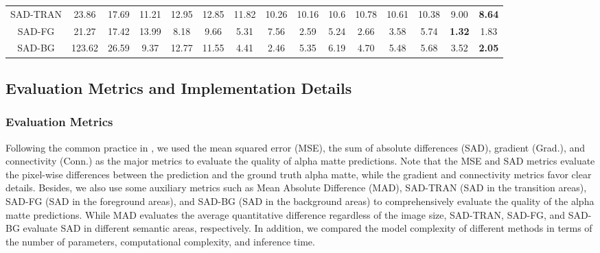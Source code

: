 \documentclass[twocolumn]{svjour3}
\begin{document}
\begin{table*}[htbp]
{\begin{tabular}{c|ccccc|ccc|ccc|ccc}
SAD-TRAN &23.86 &17.69&11.21&\multicolumn{1}{c|}{12.95} &\multicolumn{1}{c}{12.85} &\multicolumn{1}{c}{11.82}&10.26&\multicolumn{1}{c|}{10.16}&10.6&\multicolumn{1}{c}{10.78} &\multicolumn{1}{c}{10.61}&10.38 &9.00 & \textbf{8.64}\\
SAD-FG &21.27 &17.42&13.99&\multicolumn{1}{c|}{8.18}&\multicolumn{1}{c}{9.66} &\multicolumn{1}{c}{5.31}&7.56&\multicolumn{1}{c|}{2.59}&5.24&\multicolumn{1}{c}{2.66} &\multicolumn{1}{c}{3.58}&5.74 &\textbf{1.32} & 1.83\\
SAD-BG & 123.62&26.59&9.37&\multicolumn{1}{c|}{12.77} &\multicolumn{1}{c}{11.55} &\multicolumn{1}{c}{4.41}&2.46&\multicolumn{1}{c|}{5.35}&6.19&\multicolumn{1}{c}{4.70} &\multicolumn{1}{c}{5.48}& 5.68&3.52 &\textbf{2.05}\\
\hline
\end{tabular}}
\label{tab:tracks_results}
\end{table*}


\subsection{Evaluation Metrics and Implementation Details}

\subsubsection{Evaluation Metrics} Following the common practice in \citep{rhemann2009perceptually,zhang2019late,xu2017deep}, we used the mean squared error (MSE), the sum of absolute differences (SAD), gradient (Grad.), and connectivity (Conn.) as the major metrics to evaluate the quality of alpha matte predictions. Note that the MSE and SAD metrics evaluate the pixel-wise differences between the prediction and the ground truth alpha matte, while the gradient and connectivity metrics favor clear details. Besides, we also use some auxiliary metrics such as Mean Absolute Difference (MAD), SAD-TRAN (SAD in the transition areas), SAD-FG (SAD in the foreground areas), and SAD-BG (SAD in the background areas) to comprehensively evaluate the quality of the alpha matte predictions. While MAD evaluates the average quantitative difference regardless of the image size, SAD-TRAN, SAD-FG, and SAD-BG evaluate SAD in different semantic areas, respectively. In addition, we compared the model complexity of different methods in terms of the number of parameters, computational complexity, and inference time.
\end{document}
